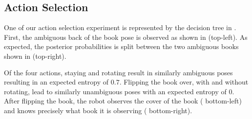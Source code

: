 \vspace{-1ex}
    \subsection{Action Selection}
	One of our action selection experiment is represented by the decision tree in .    
	First, the ambiguous back of the book pose is observed as shown in  (top-left). As expected, the posterior probabilities is split between the two ambiguous books shown in  (top-right).    

 Of the four actions, staying and rotating result in similarly ambiguous poses resulting in an expected entropy of $0.7$. Flipping the book over, with and without rotating, lead to similarly unambiguous poses with an expected entropy of $0$. After flipping the book, the robot observes the cover of the book ( bottom-left) and knows precisely what book it is observing ( bottom-right).

    
    

        

